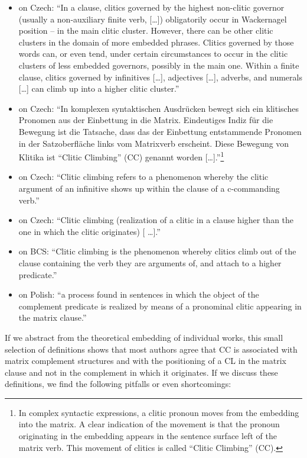 \largerpage[-1]
\begin{itemize}
\item \citet[122]{Hana07} on Czech: “In a clause, clitics governed by the highest non-clitic governor (usually a non-auxiliary finite verb, [\dots]) obligatorily occur in Wackernagel position – in the main clitic cluster. However, there can be other clitic clusters in the domain of more embedded phrases. Clitics governed by those words can, or even tend, under certain circumstances to occur in the clitic clusters of less embedded governors, possibly in the main one. Within a finite clause, clitics governed by infinitives [\dots], adjectives [\dots], adverbs, and numerals [\dots] can climb up into a higher clitic cluster.”
\item \citet[58]{Junghanns02} on Czech: “In komplexen syntaktischen Ausdrücken bewegt sich ein klitisches Pronomen aus der Einbettung in die Matrix. Eindeutiges Indiz für die Bewegung ist die Tatsache, dass das der Einbettung entstammende Pronomen in der Satzoberfläche links vom Matrixverb erscheint. Diese Bewegung von Klitika ist “Clitic Climbing” (CC) genannt worden [\dots].”\footnote{In complex syntactic expressions, a clitic pronoun moves from the embedding into the matrix. A clear indication of the movement is that the pronoun originating in the embedding appears in the sentence surface left of the matrix verb. This movement of clitics is called “Clitic Climbing” (CC).}
\item \citet[7]{Rezac05} on Czech: “Clitic climbing refers to a phenomenon whereby the clitic argument of an infinitive shows up within the clause of a c-commanding verb.”
\item \citet[70]{Dotlacil04} on Czech: “Clitic climbing (realization of a clitic in a clause higher than the one in which the clitic originates) [ \dots].” 
\item \citet[169]{Aljovic04} on BCS: “Clitic climbing is the phenomenon whereby clitics climb out of the clause containing the verb they are arguments of, and attach to a higher predicate.” 
\item \citet[152]{Slodowicz08} on Polish: “a process found in sentences in which the object of the complement predicate is realized by means of a pronominal clitic appearing in the matrix clause.”
\end{itemize}

If we abstract from the theoretical embedding of individual works, this small selection of definitions shows that most authors agree that CC is associated with matrix complement structures and with the positioning of a CL in the matrix clause and not in the complement in which it originates. If we discuss these definitions, we find the following pitfalls or even shortcomings: 


